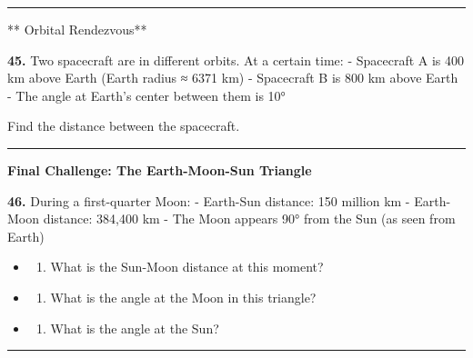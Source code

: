 \documentclass[
  11pt,
]{article}
\providecommand{\tightlist}{%
  \setlength{\itemsep}{0pt}\setlength{\parskip}{0pt}}
\begin{document}
\begin{center}\rule{0.5\linewidth}{0.5pt}\end{center}

** Orbital Rendezvous**

\textbf{45.} Two spacecraft are in different orbits. At a certain time:
- Spacecraft A is 400 km above Earth (Earth radius ≈ 6371 km) -
Spacecraft B is 800 km above Earth - The angle at Earth's center between
them is 10°

Find the distance between the spacecraft.

\begin{center}\rule{0.5\linewidth}{0.5pt}\end{center}

\textbf{Final Challenge: The Earth-Moon-Sun Triangle}

\textbf{46.} During a first-quarter Moon: - Earth-Sun distance: 150
million km - Earth-Moon distance: 384,400 km - The Moon appears 90° from
the Sun (as seen from Earth)

\begin{itemize}
\item
  \begin{enumerate}
  \def\labelenumi{(\alph{enumi})}
  \tightlist
  \item
    What is the Sun-Moon distance at this moment?
  \end{enumerate}
\item
  \begin{enumerate}
  \def\labelenumi{(\alph{enumi})}
  \setcounter{enumi}{1}
  \tightlist
  \item
    What is the angle at the Moon in this triangle?
  \end{enumerate}
\item
  \begin{enumerate}
  \def\labelenumi{(\alph{enumi})}
  \setcounter{enumi}{2}
  \tightlist
  \item
    What is the angle at the Sun?
  \end{enumerate}
\end{itemize}

\begin{center}\rule{0.5\linewidth}{0.5pt}\end{center}
\end{document}
